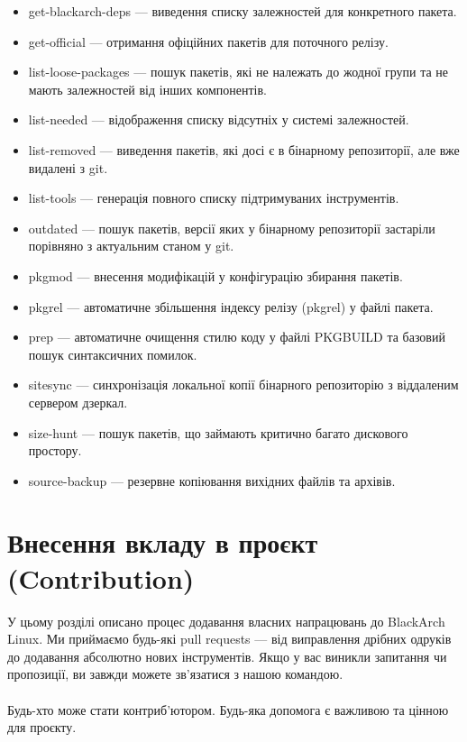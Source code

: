 \documentclass[a4paper, oneside, 11pt]{book}
\begin{document}
\begin{itemize}
  \item get-blackarch-deps --- виведення списку залежностей для конкретного пакета.
  \item get-official --- отримання офіційних пакетів для поточного релізу.
  \item list-loose-packages --- пошук пакетів, які не належать до жодної групи та не мають залежностей від інших компонентів.
  \item list-needed --- відображення списку відсутніх у системі залежностей.
  \item list-removed --- виведення пакетів, які досі є в бінарному репозиторії, але вже видалені з git.
  \item list-tools --- генерація повного списку підтримуваних інструментів.
  \item outdated --- пошук пакетів, версії яких у бінарному репозиторії застаріли порівняно з актуальним станом у git.
  \item pkgmod --- внесення модифікацій у конфігурацію збирання пакетів.
  \item pkgrel --- автоматичне збільшення індексу релізу (pkgrel) у файлі пакета.
  \item prep --- автоматичне очищення стилю коду у файлі PKGBUILD та базовий пошук синтаксичних помилок.
  \item sitesync --- синхронізація локальної копії бінарного репозиторію з віддаленим сервером дзеркал.
  \item size-hunt --- пошук пакетів, що займають критично багато дискового простору.
  \item source-backup --- резервне копіювання вихідних файлів та архівів.
\end{itemize}

\section{Внесення вкладу в проєкт (Contribution)}
У цьому розділі описано процес додавання власних напрацювань до BlackArch Linux. Ми приймаємо будь-які pull requests --- від виправлення дрібних одруків до додавання абсолютно нових інструментів. Якщо у вас виникли запитання чи пропозиції, ви завжди можете зв'язатися з нашою командою.
\\\\
Будь-хто може стати контриб'ютором. Будь-яка допомога є важливою та цінною для проєкту.
\end{document}
